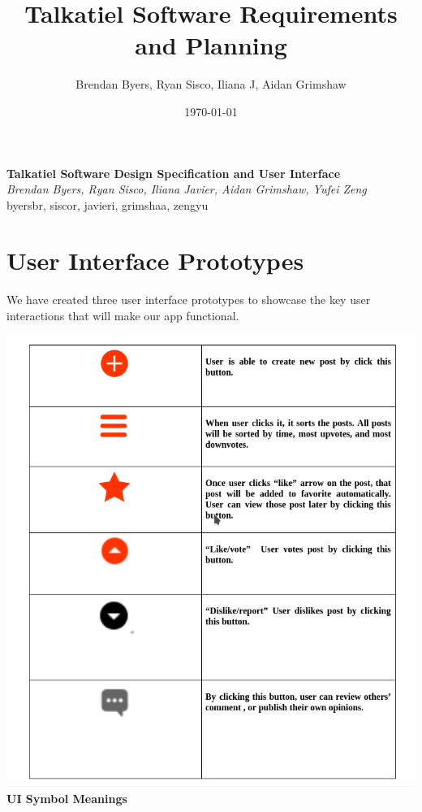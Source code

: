\documentclass[12pt]{article}
\title{Talkatiel Software Requirements and Planning}
\author{Brendan Byers, Ryan Sisco, Iliana J, Aidan Grimshaw}
\date{\today}
\begin{document}
\begin{center}
      \Large\textbf{Talkatiel Software Design Specification and User Interface}\\
      \large\textit{Brendan Byers, Ryan Sisco, Iliana Javier, Aidan Grimshaw, Yufei Zeng}\\
      \large{byersbr, siscor, javieri, grimshaa, zengyu}\\
   \end{center}

\tableofcontents
\pagebreak
\section{User Interface Prototypes}
We have created three user interface prototypes to showcase the key user interactions that will make our app functional.

\begin{center}
\includegraphics[scale=0.60]{img/ui/uiTable}\linebreak
\textbf{UI Symbol Meanings}
  \end{center}
\pagebreak
\end{document}
